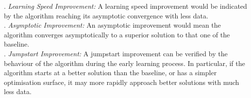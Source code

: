 
. \textit{Learning Speed Improvement:}
A learning speed improvement would be indicated by the algorithm reaching its asymptotic convergence with less data.\\
. \textit{Asymptotic Improvement:}
 An asymptotic improvement would mean the algorithm converges asymptotically to a superior solution to that one of the baseline.\\
. \textit{Jumpstart Improvement:}
A jumpstart improvement can be verified by the behaviour of the algorithm during the early learning process. In particular, if the algorithm starts at a better solution than the baseline, or has a simpler optimisation surface, it may more rapidly approach better solutions with much less data.%

